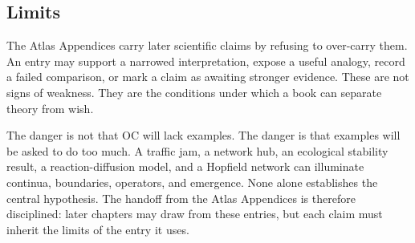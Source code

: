 \documentclass[11pt,a4paper,openany]{book}
\begin{document}
\subsection{Limits}
The Atlas Appendices carry later scientific claims by refusing to over-carry them. An entry may support a narrowed interpretation, expose a useful analogy, record a failed comparison, or mark a claim as awaiting stronger evidence. These are not signs of weakness. They are the conditions under which a book can separate theory from wish. \cite{barabasi_scale_free,may_stability_complexity}\par
The danger is not that OC will lack examples. The danger is that examples will be asked to do too much. A traffic jam, a network hub, an ecological stability result, a reaction-diffusion model, and a Hopfield network can illuminate continua, boundaries, operators, and emergence. None alone establishes the central hypothesis. The handoff from the Atlas Appendices is therefore disciplined: later chapters may draw from these entries, but each claim must inherit the limits of the entry it uses.\par
\clearpage
\nocite{*}
\printbibliography[heading=bibintoc,title={Bibliography}]
\end{document}
